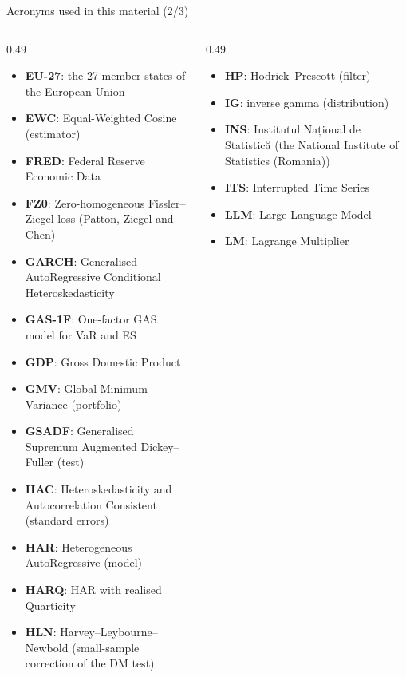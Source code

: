 \begin{frame}{Acronyms used in this material (2/3)}
\begin{columns}[T]
\begin{column}{0.49\textwidth}
\begin{itemize}\setlength{\itemsep}{0pt}
    \item \textbf{EU-27}: the 27 member states of the European Union
    \item \textbf{EWC}: Equal-Weighted Cosine (estimator)
    \item \textbf{FRED}: Federal Reserve Economic Data
    \item \textbf{FZ0}: Zero-homogeneous Fissler–Ziegel loss (Patton, Ziegel and Chen)
    \item \textbf{GARCH}: Generalised AutoRegressive Conditional Heteroskedasticity
    \item \textbf{GAS-1F}: One-factor GAS model for VaR and ES
    \item \textbf{GDP}: Gross Domestic Product
    \item \textbf{GMV}: Global Minimum-Variance (portfolio)
    \item \textbf{GSADF}: Generalised Supremum Augmented Dickey–Fuller (test)
    \item \textbf{HAC}: Heteroskedasticity and Autocorrelation Consistent (standard errors)
    \item \textbf{HAR}: Heterogeneous AutoRegressive (model)
    \item \textbf{HARQ}: HAR with realised Quarticity
    \item \textbf{HLN}: Harvey–Leybourne–Newbold (small-sample correction of the DM test)
\end{itemize}
\end{column}
\begin{column}{0.49\textwidth}
\begin{itemize}\setlength{\itemsep}{0pt}
    \item \textbf{HP}: Hodrick–Prescott (filter)
    \item \textbf{IG}: inverse gamma (distribution)
    \item \textbf{INS}: Institutul Național de Statistică (the National Institute of Statistics (Romania))
    \item \textbf{ITS}: Interrupted Time Series
    \item \textbf{LLM}: Large Language Model
    \item \textbf{LM}: Lagrange Multiplier

\end{itemize}
\end{column}
\end{columns}
\end{frame}
